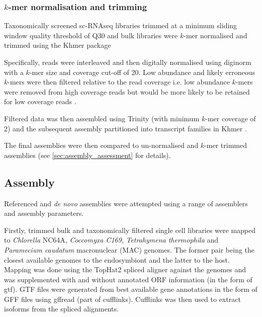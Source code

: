 \subsubsection{\(k\)-mer normalisation and trimming}

Taxonomically screened sc-RNAseq libraries trimmed at a minimum sliding window quality
threshold of Q30 and bulk libraries were \(k\)-mer normalised and trimmed using the Khmer package \citep{Crusoe2015}

Specifically, reads were interleaved \citep{Doring2008} and then digitally normalised using diginorm \citep{Brown2012}
with a \(k\)-mer size and coverage cut-off of 20.  Low abundance and likely erroneous
\(k\)-mers were then filtered relative to the read coverage i.e. low abundance \(k\)-mers were removed
from high coverage reads but would be more likely to be retained for low coverage reads \citep{Zhang2015,Zhang2014}.  

Filtered data was then assembled using Trinity (with minimum \(k\)-mer coverage of 2) 
and the subsequent assembly partitioned into transcript families in Khmer \citep{Pell2012}.

The final assemblies were then compared to un-normalised and \(k\)-mer trimmed assemblies 
(see \cref{sec:assembly_assessment} for details).


\subsection{Assembly}

Referenced and \textit{de novo} assemblies were attempted using a range of assemblers
and assembly parameters.

Firstly, trimmed bulk and taxonomically filtered single cell libraries
were mapped to \textit{Chlorella} NC64A, \textit{Coccomyxa C169}, 
\textit{Tetrahymena thermophila} and \textit{Paramecium caudatum} macronuclear (MAC) genomes.
The former pair being the closest available genomes to the endosymbiont and the latter to the host.
Mapping was done using the TopHat2 spliced aligner \citep{Kim2013} against
the genomes and was supplemented with and without annotated ORF information (in the form of gtf).
GTF files were generated from best available gene annotations in the form of GFF files using gffread (part of
cufflinks).
Cufflinks \citep{Trapnell2011} was then used to extract isoforms from the spliced alignments.

